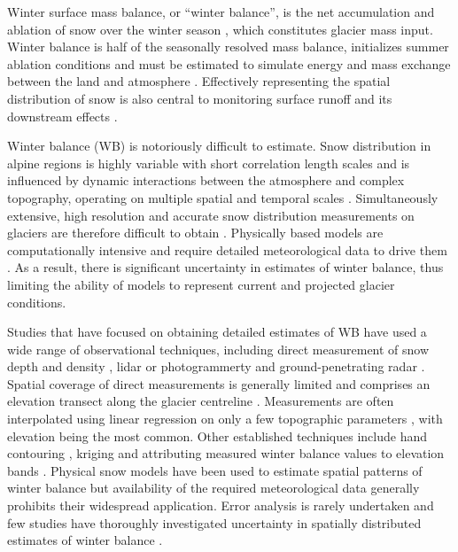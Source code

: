 \documentclass[review,oneside, letterpaper]{igs}
\begin{document}
Winter surface mass balance, or ``winter balance'', is the net accumulation and ablation of snow over the winter season \citep{Cogley2011}, which constitutes glacier mass input. Winter balance is half of the seasonally resolved mass balance, initializes summer ablation conditions and must be estimated to simulate energy and mass exchange between the land and atmosphere \citep[e.g.][]{Hock2005,Reveillet2016}. Effectively representing the spatial distribution of snow is also central to monitoring surface runoff and its downstream effects \citep[e.g.][]{Clark2011}.

Winter balance (WB) is notoriously difficult to estimate. Snow distribution in alpine regions is highly variable with short correlation length scales \citep[e.g.][]{Anderton2004, Egli2011, Grunewald2010, Helbig2017, Lopez2011, Lopez2013, Machguth2006, Marshall2006} and is influenced by dynamic interactions between the atmosphere and complex topography, operating on multiple spatial and temporal scales \citep[e.g.][]{Barry1992, Liston2006, Clark2011}. Simultaneously extensive, high resolution and accurate snow distribution measurements on glaciers are therefore difficult to obtain \citep[e.g.][]{Cogley2011, McGrath2015}. Physically based models are computationally intensive and require detailed meteorological data to drive them \citep{Dadic2010}. As a result, there is significant uncertainty in estimates of winter balance, thus limiting the ability of models to represent current and projected glacier conditions.

Studies that have focused on obtaining detailed estimates of WB have used a wide range of observational techniques, including direct measurement of snow depth and density \citep[e.g.][]{Cullen2017}, lidar or photogrammerty \citep[e.g.][]{Sold2013} and ground-penetrating radar \citep[e.g.][]{Machguth2006, Gusmeroli2014, McGrath2015}. Spatial coverage of direct measurements is generally limited and comprises an elevation transect along the glacier centreline \citep[e.g.][]{Kaser2003}. Measurements are often interpolated using linear regression on only a few topographic parameters \citep[e.g.][]{MacDougall2011}, with elevation being the most common. Other established techniques include hand contouring \citep[e.g.][]{Tangborn1975}, kriging \citep[e.g.][]{Hock1999} and attributing measured winter balance values to elevation bands \citep[e.g.][]{Thibert2008}. Physical snow models have been used to estimate spatial patterns of winter balance \citep[e.g.][]{Mott2008, Schuler2008, Dadic2010} but availability of the required meteorological data generally prohibits their widespread application. Error analysis is rarely undertaken and few studies have thoroughly investigated uncertainty in spatially distributed estimates of winter balance  \citep[c.f.][]{Schuler2008}. 
\end{document}
